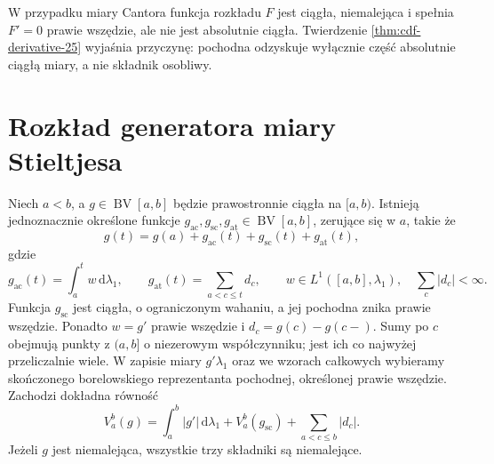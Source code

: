 \begin{przyklad}
W przypadku miary Cantora funkcja rozkładu $F$ jest
ciągła, niemalejąca i spełnia $F'=0$ prawie wszędzie,
ale nie jest absolutnie ciągła. Twierdzenie
\ref{thm:cdf-derivative-25} wyjaśnia przyczynę:
pochodna odzyskuje wyłącznie część absolutnie ciągłą
miary, a nie składnik osobliwy.
\end{przyklad}

\section{Rozkład generatora miary Stieltjesa}

\begin{twierdzenie}
\label{it:thm:stieltjes-generator-decomposition}
Niech $a<b$, a $g\in\operatorname{BV}[a,b]$ będzie prawostronnie ciągła
na $[a,b)$. Istnieją jednoznacznie określone funkcje
$g_{\mathrm{ac}},g_{\mathrm{sc}},g_{\mathrm{at}}\in\operatorname{BV}[a,b]$,
zerujące się w $a$, takie że
\[
 g(t)=g(a)+g_{\mathrm{ac}}(t)+g_{\mathrm{sc}}(t)+g_{\mathrm{at}}(t),
\]
gdzie
\[
 g_{\mathrm{ac}}(t)=\int_a^t w\,\mathrm d\lambda_1,\qquad
 g_{\mathrm{at}}(t)=\sum_{a<c\le t}d_c,
 \qquad w\in L^1([a,b],\lambda_1),\quad \sum_c|d_c|<\infty.
\]
Funkcja $g_{\mathrm{sc}}$ jest ciągła, o ograniczonym
wahaniu, a jej pochodna znika prawie wszędzie.
Ponadto $w=g'$ prawie wszędzie i $d_c=g(c)-g(c-)$.
Sumy po $c$ obejmują punkty z $(a,b]$ o niezerowym
współczynniku; jest ich co najwyżej przeliczalnie wiele.
W zapisie miary $g'\lambda_1$ oraz we wzorach całkowych
wybieramy skończonego borelowskiego reprezentanta
pochodnej, określonej prawie wszędzie.
Zachodzi dokładna równość
\[
 V_a^b(g)=\int_a^b|g'|\,\mathrm d\lambda_1+
 V_a^b(g_{\mathrm{sc}})+\sum_{a<c\le b}|d_c|.
\]
Jeżeli $g$ jest niemalejąca, wszystkie trzy składniki
są niemalejące.
\end{twierdzenie}
